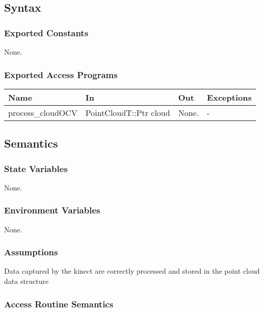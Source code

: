 \documentclass[12pt, titlepage]{article}
\begin{document}
\subsection{Syntax}

\subsubsection{Exported Constants}

None.

\subsubsection{Exported Access Programs}

\begin{center}
\begin{tabular}{p{4cm} p{4cm} p{2cm} p{2cm}}
\hline
\textbf{Name} & \textbf{In} & \textbf{Out} & \textbf{Exceptions} \\
\hline
process\_cloudOCV & PointCloudT::Ptr cloud & None. & - \\
\hline
\end{tabular}
\end{center}

\subsection{Semantics}

\subsubsection{State Variables}

None.

\subsubsection{Environment Variables}

None.

\subsubsection{Assumptions}

Data captured by the kinect are correctly processed and stored in the point cloud data structure

\subsubsection{Access Routine Semantics}
\end{document}
